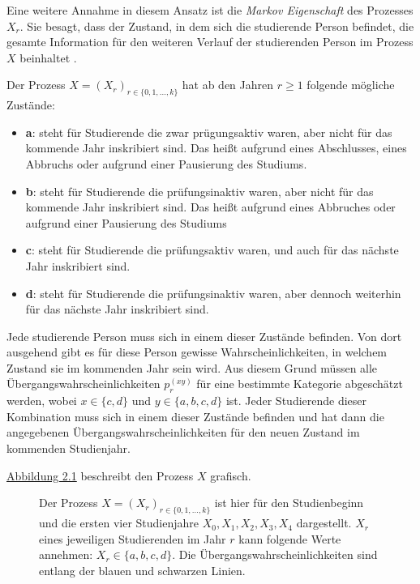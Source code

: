 Eine weitere Annahme in diesem Ansatz ist die \textit{Markov Eigenschaft} des Prozesses $X_r$. Sie besagt, dass der Zustand, in dem sich die studierende Person
befindet, die gesamte Information f\"ur den weiteren Verlauf der studierenden Person im Prozess $X$ beinhaltet \cite[Seite 340]{tsitsiklis}.


Der Prozess $X = (X_r)_{r \in \{ 0,1, \dots, k \} }$ hat ab den Jahren $r \geq 1$ folgende m\"ogliche Zust\"ande:
\begin{itemize}
  \item \textbf{a}: steht f\"ur Studierende die zwar pr\"ugungsaktiv waren, aber nicht f\"ur das kommende Jahr inskribiert sind. Das hei{\ss}t aufgrund eines Abschlusses, eines Abbruchs oder aufgrund einer Pausierung des Studiums.
  \item \textbf{b}: steht f\"ur Studierende die pr\"ufungsinaktiv waren, aber nicht f\"ur das kommende Jahr inskribiert sind. Das hei{\ss}t aufgrund eines Abbruches oder aufgrund einer Pausierung des Studiums
  \item \textbf{c}: steht f\"ur Studierende die pr\"ufungsaktiv waren, und auch f\"ur das n\"achste Jahr inskribiert sind.
  \item \textbf{d}: steht f\"ur Studierende die pr\"ufungsinaktiv waren, aber dennoch weiterhin f\"ur das n\"achste Jahr inskribiert sind.
\end{itemize}



Jede studierende Person muss sich in einem dieser Zust\"ande befinden. Von dort ausgehend gibt es f\"ur diese Person gewisse Wahrscheinlichkeiten,
in welchem Zustand sie im kommenden Jahr sein wird.
Aus diesem Grund müssen alle Übergangswahrscheinlichkeiten $p_r^{(xy)}$ f\"ur eine bestimmte Kategorie
abgeschätzt werden, wobei $x \in \{c, d \}$ und $y \in \{a, b, c, d\}$ ist.
Jeder Studierende dieser Kombination muss sich in einem dieser Zustände befinden und hat dann die
angegebenen Übergangswahrscheinlichkeiten für den neuen Zustand im kommenden Studienjahr.

\hyperref[fig:prozess]{ Abbildung 2.1} beschreibt den Prozess $X$ grafisch.

\begin{figure}[ht]
  \label{fig:prozess}
  \begin{center}
  \end{center}
  \caption[Grafische Darstellung des zweiten Modells]
  {Der Prozess $X = (X_r)_{r \in \{ 0,1, \dots, k \} }$ ist hier für den Studienbeginn und die ersten vier Studienjahre $X_0, X_1, X_2, X_3, X_4$ dargestellt.
    $X_r$ eines jeweiligen Studierenden im Jahr $r$ kann folgende Werte annehmen: $X_r \in \{a, b, c, d\}$.
    Die Übergangswahrscheinlichkeiten sind entlang der blauen und schwarzen Linien.}
\end{figure}

